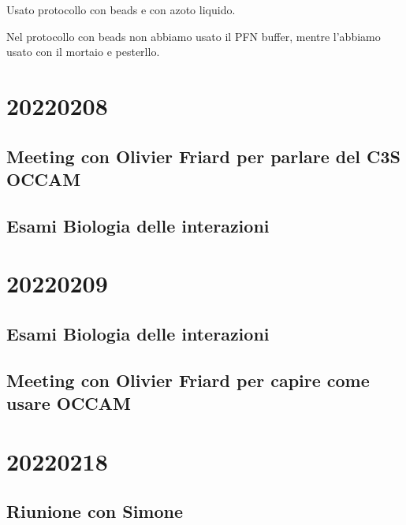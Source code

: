 \documentclass[
]{book}
\begin{document}
Usato protocollo con beads e con azoto liquido.

Nel protocollo con beads non abbiamo usato il PFN buffer, mentre l'abbiamo usato con il mortaio e pesterllo.

\hypertarget{D20220208}{%
\section{20220208}\label{D20220208}}

\hypertarget{meeting-con-olivier-friard-per-parlare-del-c3s-occam}{%
\subsection{Meeting con Olivier Friard per parlare del C3S OCCAM}\label{meeting-con-olivier-friard-per-parlare-del-c3s-occam}}

\hypertarget{esami-biologia-delle-interazioni}{%
\subsection{Esami Biologia delle interazioni}\label{esami-biologia-delle-interazioni}}

\hypertarget{D20220209}{%
\section{20220209}\label{D20220209}}

\hypertarget{esami-biologia-delle-interazioni-1}{%
\subsection{Esami Biologia delle interazioni}\label{esami-biologia-delle-interazioni-1}}

\hypertarget{meeting-con-olivier-friard-per-capire-come-usare-occam}{%
\subsection{Meeting con Olivier Friard per capire come usare OCCAM}\label{meeting-con-olivier-friard-per-capire-come-usare-occam}}

\hypertarget{D20220218}{%
\section{20220218}\label{D20220218}}

\hypertarget{riunione-con-simone}{%
\subsection{Riunione con Simone}\label{riunione-con-simone}}
\end{document}
